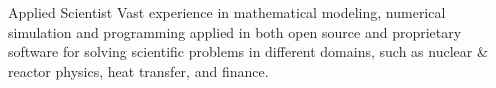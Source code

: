
\begin{cvskills}

	\cvskill
	{Applied Scientist}
		{Vast experience in mathematical modeling, numerical simulation and programming applied in both open source and proprietary software for solving scientific problems in different domains, such as nuclear \& reactor physics, heat transfer, and finance.}

\end{cvskills}
